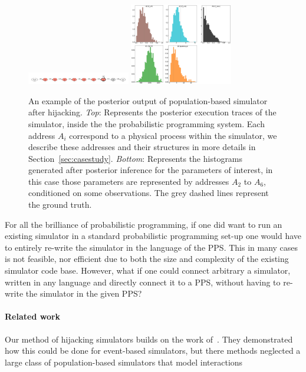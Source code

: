 \documentclass{article}
\begin{document}
\begin{figure}
\vspace{-20pt}
\centering
\includegraphics[width=0.40\textwidth]{../plots/model_lambda/model_posterior.pdf}
\includegraphics[width=0.40\textwidth]{../plots/model_lambda/hist_posteriors.png}
\caption{An example of the posterior output of population-based simulator after hijacking. \textit{Top}: Represents the posterior execution traces of the simulator, inside the the probabilistic programming 
system. Each address $A_{i}$ correspond to a physical process within the simulator, we describe these addresses and their structures in more details in Section~\ref{sec:casestudy}.
\textit{Bottom}: Represents the histograms generated after posterior inference for the parameters of interest, in this case those parameters are represented by addresses $A_{2}$ to $A_{6}$, conditioned on some observations. 
The grey dashed lines represent the ground truth.}
\vspace{-25pt}
\label{fig:hijacking} 
\end{figure}
For all the brilliance of probabilistic programming, if one did want to run an existing simulator in a standard probabilistic programming set-up one would have to entirely re-write the simulator in the language of the PPS.
This in many cases is not feasible, nor efficient due to both the size 
and complexity of the existing simulator code base. 
However, what if one could connect arbitrary a simulator, written in any
language and directly connect it to a PPS, without having to re-write
the simulator in the given PPS?

  
\paragraph{Related work} Our method of hijacking simulators builds on the work of~\cite{baydin2018efficient,casado2017improvements}. 
They demonstrated how this could be done for event-based simulators, but there methods neglected a large class of population-based simulators that model interactions 
\end{document}

